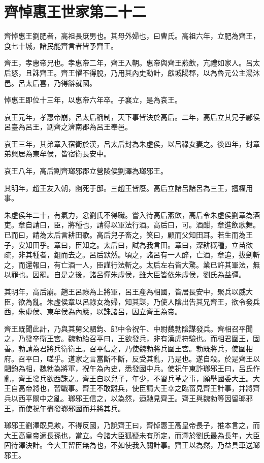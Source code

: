 \chapter{齊悼惠王世家第二十二}

齊悼惠王劉肥者，高祖長庶男也。其母外婦也，曰曹氏。高祖六年，立肥為齊王，食七十城，諸民能齊言者皆予齊王。

齊王，孝惠帝兄也。孝惠帝二年，齊王入朝。惠帝與齊王燕飲，亢禮如家人。呂太后怒，且誅齊王。齊王懼不得脫，乃用其內史勳計，獻城陽郡，以為魯元公主湯沐邑。呂太后喜，乃得辭就國。

悼惠王即位十三年，以惠帝六年卒。子襄立，是為哀王。

哀王元年，孝惠帝崩，呂太后稱制，天下事皆決於高后。二年，高后立其兄子酈侯呂臺為呂王，割齊之濟南郡為呂王奉邑。

哀王三年，其弟章入宿衛於漢，呂太后封為朱虛侯，以呂祿女妻之。後四年，封章弟興居為東牟侯，皆宿衛長安中。

哀王八年，高后割齊瑯邪郡立營陵侯劉澤為瑯邪王。

其明年，趙王友入朝，幽死于邸。三趙王皆廢。高后立諸呂諸呂為三王，擅權用事。

朱虛侯年二十，有氣力，忿劉氏不得職。嘗入待高后燕飲，高后令朱虛侯劉章為酒吏。章自請曰，臣，將種也，請得以軍法行酒。高后曰，可。酒酣，章進飲歌舞。已而曰，請為太后言耕田歌。高后兒子畜之，笑曰，顧而父知田耳。若生而為王子，安知田乎。章曰，臣知之。太后曰，試為我言田。章曰，深耕穊種，立苗欲疏，非其種者，鉏而去之。呂后默然。頃之，諸呂有一人醉，亡酒，章追，拔劍斬之，而還報曰，有亡酒一人，臣謹行法斬之。太后左右皆大驚。業已許其軍法，無以罪也。因罷。自是之後，諸呂憚朱虛侯，雖大臣皆依朱虛侯，劉氏為益彊。

其明年，高后崩。趙王呂祿為上將軍，呂王產為相國，皆居長安中，聚兵以威大臣，欲為亂。朱虛侯章以呂祿女為婦，知其謀，乃使人陰出告其兄齊王，欲令發兵西，朱虛侯、東牟侯為內應，以誅諸呂，因立齊王為帝。

齊王既聞此計，乃與其舅父駟鈞、郎中令祝午、中尉魏勃陰謀發兵。齊相召平聞之，乃發卒衛王宮。魏勃紿召平曰，王欲發兵，非有漢虎符驗也。而相君圍王，固善。勃請為君將兵衛衛王。召平信之，乃使魏勃將兵圍王宮。勃既將兵，使圍相府。召平曰，嗟乎。道家之言當斷不斷，反受其亂，乃是也。遂自殺。於是齊王以駟鈞為相，魏勃為將軍，祝午為內史，悉發國中兵。使祝午東詐瑯邪王曰，呂氏作亂，齊王發兵欲西誅之。齊王自以兒子，年少，不習兵革之事，願舉國委大王。大王自高帝將也，習戰事。齊王不敢離兵，使臣請大王幸之臨菑見齊王計事，并將齊兵以西平關中之亂。瑯邪王信之，以為然，迺馳見齊王。齊王與魏勃等因留瑯邪王，而使祝午盡發瑯邪國而并將其兵。

瑯邪王劉澤既見欺，不得反國，乃說齊王曰，齊悼惠王高皇帝長子，推本言之，而大王高皇帝適長孫也，當立。今諸大臣狐疑未有所定，而澤於劉氏最為長年，大臣固待澤決計。今大王留臣無為也，不如使我入關計事。齊王以為然，乃益具車送瑯邪王。

